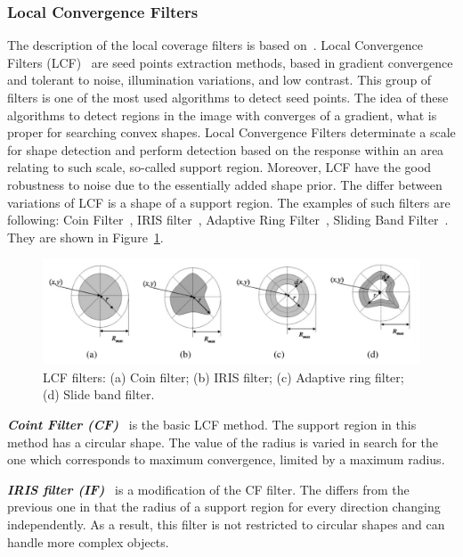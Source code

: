 \documentclass{lutmscthesis}[2010/09/22]
\begin{document}
\subsubsection{Local Convergence Filters}
The description of the local coverage filters is based on~\cite{LCF}.
Local Convergence Filters (LCF)~\cite{LCF} are seed points extraction methods, based
in gradient convergence and tolerant to noise, illumination variations, and low contrast.
This group of filters is one of the most used algorithms to detect seed points.
The idea of these algorithms to detect regions in the image with converges of a gradient, what is proper for searching convex shapes. 
Local Convergence Filters determinate a scale for shape detection and perform
detection based on the response within an area relating to
such scale, so-called support region. Moreover, LCF have the good robustness to noise due to the essentially added shape prior. The differ between variations of LCF is a shape of a support region. The examples of such filters are following: Coin Filter~\cite{LCF_CF}, IRIS filter~\cite{LCF_CF}, Adaptive Ring Filter~\cite{LCF-ARF}, Sliding Band Filter~\cite{LCF-SBF}. They are shown in Figure~\ref{fig:LCF-alg}.

\begin{figure}[ht]
  \includegraphics[width=\linewidth]{LCF.png}
  \caption{LCF filters: (a) Coin filter; (b) IRIS filter; (c) Adaptive ring filter; (d) Slide band filter.~\cite{LCF}}
  \label{fig:LCF-alg}
\end{figure}


\textit{\textbf{Coint Filter (CF)}}~\cite{LCF_CF} is the basic LCF method. The support region in this method has a circular shape. The value of the radius is varied in search for the one which
corresponds to maximum convergence, limited by a maximum
radius. 

\textit{\textbf{IRIS filter (IF)}}~\cite{LCF_CF} is a modification of the CF filter. The differs from the previous one in that the radius of a support region for every direction changing independently. As a result, this filter is not restricted to circular shapes and can handle more complex objects. 
\end{document}
